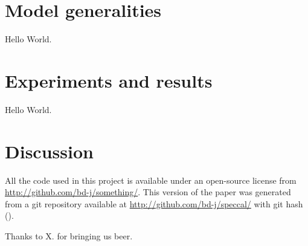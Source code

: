 \documentclass[iop,numberedappendix]{emulateapj}
\begin{document}
\section{Model generalities}

Hello World.

\section{Experiments and results}

Hello World.

\section{Discussion}

All the code used in this project is available under an open-source license
  from \url{http://github.com/bd-j/something/}.
This version of the paper was generated
  from a git repository available at \url{http://github.com/bd-j/speccal/}
  with git hash \texttt{\githash} (\gitdate).

\acknowledgements
Thanks to X. for bringing us beer.
\end{document}
